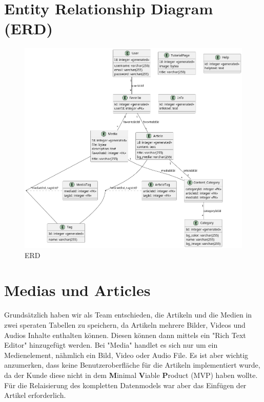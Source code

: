 \section{\textbf{E}ntity \textbf{R}elationship \textbf{D}iagram (ERD)}
\begin{spacing}{1}

  \begin{figure}[H]
    \centering
    \includegraphics[height=1\textwidth]{./pics/erd.png}
    \caption{ERD}

  \end{figure}
\end{spacing}


\section{Medias und Articles}

Grundsätzlich haben wir als Team entschieden,
die Artikeln und die Medien in zwei speraten Tabellen zu speichern,
da Artikeln mehrere Bilder, Videos und Audios Inhalte enthalten können.
Diesen können dann mittels ein "Rich Text Editor" hinzugefügt werden.
Bei "Media" handlet es sich nur um ein Medienelement,
nähmlich ein Bild, Video oder Audio File. Es ist aber wichtig anzumerken,
dass keine Benutzeroberfläche für die Artikeln implementiert wurde, da der Kunde
diese nicht in dem \textbf{M}inimal \textbf{V}iable \textbf{P}roduct (MVP) haben wollte.
Für die Relaisierung des kompletten Datenmodels war aber das Einfügen der Artikel erforderlich.

